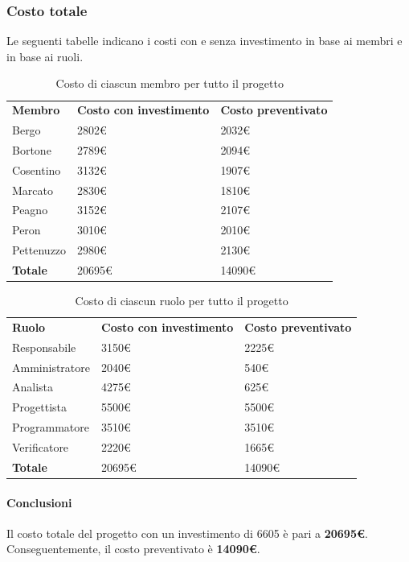 	\subsubsection{Costo totale}
		Le seguenti tabelle indicano i costi con e senza investimento in base ai membri e in base ai ruoli.
		\begin{table}[H]
			\centering
			\begin{tabular}{| l | l | l |}
				\rowcolor{LightBlue}
				\textbf{\color{white}Membro}
				& \textbf{\color{white}Costo con investimento}
				& \textbf{\color{white}Costo preventivato}\\
				
				Bergo				& 2802€ & 2032€\\
				Bortone			& 2789€ & 2094€\\
				Cosentino		& 3132€ & 1907€\\
				Marcato			& 2830€ & 1810€\\
				Peagno				& 3152€ & 2107€\\
				Peron				& 3010€ & 2010€\\
				Pettenuzzo		& 2980€ & 2130€\\ \hline
				\textbf{Totale} & 20695€ & 14090€\\ \hline
			\end{tabular}
			\caption{Costo di ciascun membro per tutto il progetto}
		\end{table}
		
		\begin{table}[H]
			\centering
			\begin{tabular}{| l | l | l |}
				\rowcolor{LightBlue}
				\textbf{\color{white}Ruolo}
				& \textbf{\color{white}Costo con investimento}
				& \textbf{\color{white}Costo preventivato}\\
				
				Responsabile 		& 3150€ & 2225€\\
				Amministratore 	& 2040€ & 540€\\
				Analista 				& 4275€ & 625€\\			
				Progettista 			& 5500€ & 5500€\\
				Programmatore 		& 3510€ & 3510€\\
				Verificatore 		& 2220€ & 1665€\\ \hline
				\textbf{Totale} 	& 20695€ & 14090€\\ \hline
			\end{tabular}		
			\caption{Costo di ciascun ruolo per tutto il progetto}
		\end{table}
		
		\paragraph{Conclusioni\\}
		Il costo totale del progetto con un investimento di 6605 è pari a \textbf{20695€}. Conseguentemente, il costo preventivato è \textbf{14090€}.